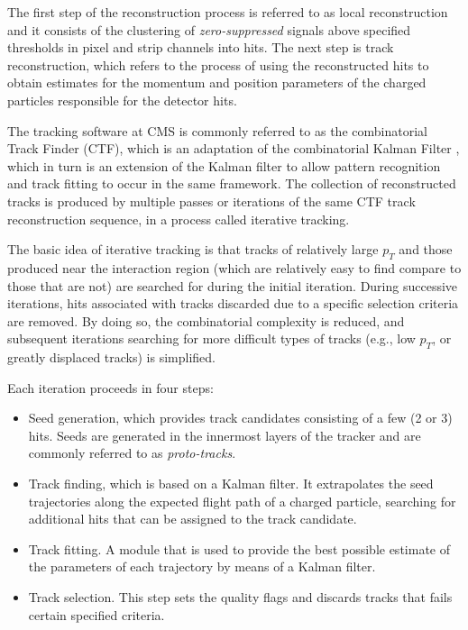 The first step of the reconstruction process is referred to as local reconstruction and it consists of the clustering of \textit{zero-suppressed} signals above specified thresholds in pixel and strip channels into hits. The next step is track reconstruction, which refers to the process of using the reconstructed hits to obtain estimates for the momentum and position parameters of the charged particles responsible for the detector hits. 

The tracking software at CMS\cite{TRK-11-001} is commonly referred to as the combinatorial Track Finder (CTF), which is an adaptation of the combinatorial Kalman Filter \cite{Billoir:1989mh,BILLOIR1990219,Mankel:1997dy}, which in turn is an extension of the Kalman filter\cite{Fruhwirth:1987fm} to allow pattern recognition and track fitting to occur in the same framework. The collection of reconstructed tracks is produced by multiple passes or iterations of the same CTF track reconstruction sequence, in a process called iterative tracking. 

The basic idea of iterative tracking is that tracks of relatively large $p_{T}$ and those produced near the interaction region (which are relatively easy to find compare to those that are not) are searched for during the initial iteration. During successive iterations, hits associated with tracks discarded due to a specific selection criteria are removed. By doing so, the combinatorial complexity is reduced, and subsequent iterations searching for more difficult types of tracks (e.g., low $p_{T}$, or greatly displaced tracks) is simplified.

Each iteration proceeds in four steps:

\begin{itemize}
	\item Seed generation, which provides track candidates consisting of a few (2 or 3) hits. Seeds are generated in the innermost layers of the tracker and are commonly referred to as \textit{proto-tracks}.
	\item Track finding, which is based on a Kalman filter. It extrapolates the seed trajectories along the expected flight path of a charged particle, searching for additional hits that can be assigned to the track candidate.
	\item Track fitting. A module that is used to provide the best possible estimate of the parameters of each trajectory by means of a Kalman filter.
	\item Track selection. This step sets the quality flags and discards tracks that fails certain specified criteria.
\end{itemize}


